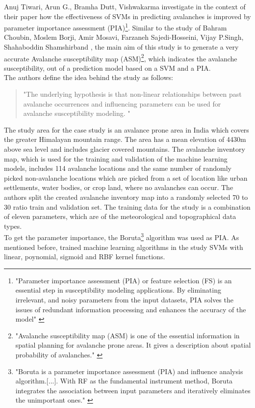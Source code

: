 \documentclass[../masterarbeit.tex]{subfiles}
\begin{document}
Anuj Tiwari, Arun G., Bramha Dutt, Vishwakarma \textcite[]{Tiwari:2021} investigate in the context of their paper how the effectiveness of SVMs in predicting avalanches is improved by parameter importance assessment (PIA)\footnote{ "Parameter importance assessment (PIA) or feature selection (FS) is an essential step in susceptibility modeling applications. By eliminating irrelevant, and noisy parameters from the input datasets, PIA solves the issues of redundant information processing and enhances the accuracy of the model" \autocite[]{Tiwari:2021} }.
Similar to the study of Bahram Choubin, Moslem Borji, Amir Mosavi, Farzaneh Sajedi-Hosseini, Vijay P.Singh, Shahaboddin Shamshirband \textcite[]{Bahram:2019}, the main aim of this study is to generate a very accurate Avalanche susceptibility map (ASM)\footnote{ "Avalanche susceptibility map (ASM) is one of the essential information in spatial planning for avalanche prone areas. It gives a description about spatial probability of avalanches." \autocite[]{Tiwari:2021}}, 
which indicates the avalanche susceptibility, out of a prediction model based on a SVM and a PIA. \autocite[]{Tiwari:2021} \\
The authors define the idea behind the study as follows:
\begin{quote}
	"The underlying hypothesis is that non-linear relationships between past avalanche occurrences and influencing parameters can be used for avalanche susceptibility modeling. " \autocite[]{Tiwari:2021} 
\end{quote}
The study area for the case study is an avalance prone area in India which covers the greater Himalayan mountain range. The area has a mean elevation of 4430m above sea level and includes glacier covered mountains. The avalanche inventory map, which is used for the training and validation of the machine learning models, includes 114 avalanche locations and the same number of randomly picked non-avalanche locations which are picked from a set of location like urban settlements, water bodies, or crop land, where no avalanches can occur. The authors split the created avalanche inventory map into a randomly selected 70 to 30 ratio train and validation set.
The training data for the study is a combination of eleven parameters, which are of the meteorological and topographical data types. \autocite[]{Tiwari:2021} \\
To get the parameter importance, the Boruta\footnote{"Boruta is a parameter importance assessment (PIA) and influence analysis algorithm.[...]. With RF as the fundamental instrument method, Boruta integrates the association between input parameters and iteratively eliminates the unimportant ones." \autocite[]{Tiwari:2021}} algorithm was used as PIA. As mentioned before, trained machine learning algorithms in the study SVMs with linear, poynomial, sigmoid and RBF kernel functions.
\end{document}
